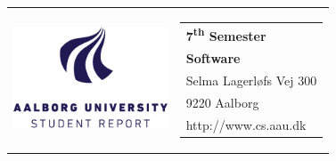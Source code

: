 \begin{titlepage}
	\setlength{\textwidth}{15cm}
	\noindent
	\begin{nopagebreak}
		{\samepage
			\begin{tabular}{lr}
				\parbox{0.5\textwidth}{\raisebox{11mm}
					{\includegraphics[height=3cm]{img/aau-logo-english.png}}
				} &
				\parbox{0.4\textwidth}{
					\small
					\begin{tabular}{l}
						{\sf\small \textbf{7\textsuperscript{th} Semester}}\\
 						{\sf\small \textbf{Software}}\\
						{\sf\small Selma Lagerløfs Vej 300 } \\
						{\sf\small 9220 Aalborg} \\
						{\sf\small http://www.cs.aau.dk}
					\end{tabular}
				}
			\end{tabular}

}
\end{nopagebreak}
\end{titlepage}
